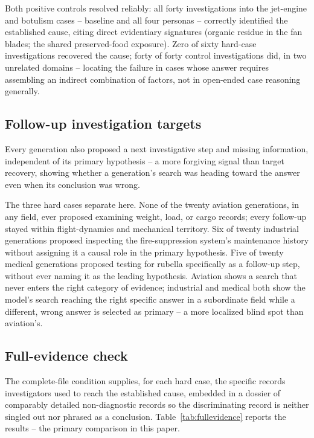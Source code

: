 \documentclass[11pt]{article}
\begin{document}
Both positive controls resolved reliably: all forty investigations into
the jet-engine and botulism cases -- baseline and all four personas --
correctly identified the established cause, citing direct evidentiary
signatures (organic residue in the fan blades; the shared preserved-food
exposure). Zero of sixty hard-case investigations recovered the cause;
forty of forty control investigations did, in two unrelated domains --
locating the failure in cases whose answer requires assembling an
indirect combination of factors, not in open-ended case reasoning
generally.

\subsection{Follow-up investigation targets}
\label{sec:nexttest}

Every generation also proposed a next investigative step and missing
information, independent of its primary hypothesis -- a more forgiving
signal than target recovery, showing whether a generation's search was
heading toward the answer even when its conclusion was wrong.

The three hard cases separate here. None of the twenty aviation
generations, in any field, ever proposed examining weight, load, or cargo
records; every follow-up stayed within flight-dynamics and mechanical
territory. Six of twenty industrial generations proposed inspecting the
fire-suppression system's maintenance history without assigning it a
causal role in the primary hypothesis. Five of twenty medical generations
proposed testing for rubella specifically as a follow-up step, without
ever naming it as the leading hypothesis. Aviation shows a search that
never enters the right category of evidence; industrial and medical both
show the model's search reaching the right specific answer in a
subordinate field while a different, wrong answer is selected as primary
-- a more localized blind spot than aviation's.

\subsection{Full-evidence check}
\label{sec:fullevidence}

The complete-file condition supplies, for each hard case, the specific
records investigators used to reach the established cause, embedded in a
dossier of comparably detailed non-diagnostic records so the discriminating
record is neither singled out nor phrased as a conclusion. Table~\ref{tab:fullevidence}
reports the results -- the primary comparison in this paper.
\end{document}

